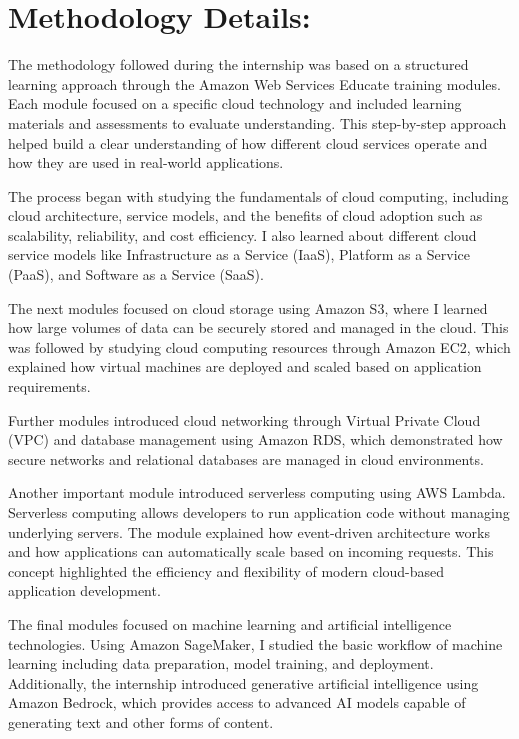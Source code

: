 \documentclass[12pt, a4paper, oneside]{report}
\begin{document}
\section{Methodology Details:}

The methodology followed during the internship was based on a structured learning 
approach through the Amazon Web Services Educate training modules. Each module 
focused on a specific cloud technology and included learning materials and assessments 
to evaluate understanding. This step-by-step approach helped build a clear 
understanding of how different cloud services operate and how they are used in 
real-world applications.

The process began with studying the fundamentals of cloud computing, including cloud 
architecture, service models, and the benefits of cloud adoption such as scalability, 
reliability, and cost efficiency. I also learned about different cloud service models like 
Infrastructure as a Service (IaaS), Platform as a Service (PaaS), and Software as a 
Service (SaaS).

The next modules focused on cloud storage using Amazon S3, where I learned how 
large volumes of data can be securely stored and managed in the cloud. This was 
followed by studying cloud computing resources through Amazon EC2, which 
explained how virtual machines are deployed and scaled based on application 
requirements.

Further modules introduced cloud networking through Virtual Private Cloud (VPC) 
and database management using Amazon RDS, which demonstrated how secure 
networks and relational databases are managed in cloud environments.

Another important module introduced serverless computing using AWS Lambda. 
Serverless computing allows developers to run application code without managing 
underlying servers. The module explained how event-driven architecture works and how 
applications can automatically scale based on incoming requests. This concept 
highlighted the efficiency and flexibility of modern cloud-based application development.

The final modules focused on machine learning and artificial intelligence technologies. 
Using Amazon SageMaker, I studied the basic workflow of machine learning including 
data preparation, model training, and deployment. Additionally, the internship 
introduced generative artificial intelligence using Amazon Bedrock, which provides 
access to advanced AI models capable of generating text and other forms of content.
\end{document}
